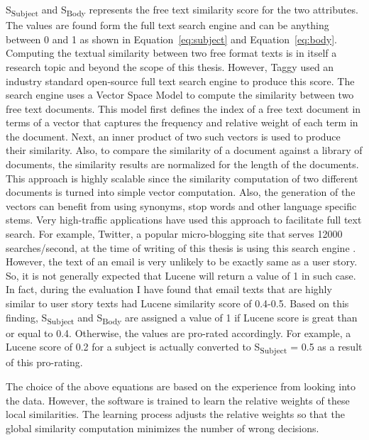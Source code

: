 S\textsubscript{Subject} and S\textsubscript{Body} represents the free text similarity score for the two attributes. The values are found form the full text search engine and can be anything between 0 and 1 as shown in Equation~\ref{eq:subject} and Equation~\ref{eq:body}. Computing the textual similarity between two free format texts is in itself a research topic and beyond the scope of this thesis. However, Taggy used an industry standard open-source full text search engine to produce this score. The search engine uses a Vector Space Model \cite{a_vector_space} to compute the similarity between two free text documents. This model first defines the index of a free text document in terms of a vector that captures the frequency and relative weight of each term in the document. Next, an inner product of two such vectors is used to produce their similarity. Also, to compare the similarity of a document against a library of documents, the similarity results are normalized for the length of the documents. This approach is highly scalable since the similarity computation of two different documents is turned into simple vector computation. Also, the generation of the vectors can benefit from using synonyms, stop words and other language specific stems. Very high-traffic applications have used this approach to facilitate full text search. For example, Twitter, a popular micro-blogging site that serves 12000 searches/second, at the time of writing of this thesis is using this search engine \cite{twitter_lucene}. However, the text of an email is very unlikely to be exactly same as a user story. So, it is not generally expected that Lucene will return a value of 1 in such case. In fact, during the evaluation I have found that email texts that are highly similar to user story texts had Lucene similarity score of 0.4-0.5. Based on this finding, S\textsubscript{Subject} and S\textsubscript{Body} are assigned a value of 1 if Lucene score is great than or equal to 0.4. Otherwise, the values are pro-rated accordingly. For example, a Lucene score of 0.2 for a subject is actually converted to S\textsubscript{Subject} = 0.5 as a result of this pro-rating.

The choice of the above equations are based on the experience from looking into the data. However, the software is trained to learn the relative weights of these local similarities. The learning process adjusts the relative weights so that the global similarity computation minimizes the number of wrong decisions.

